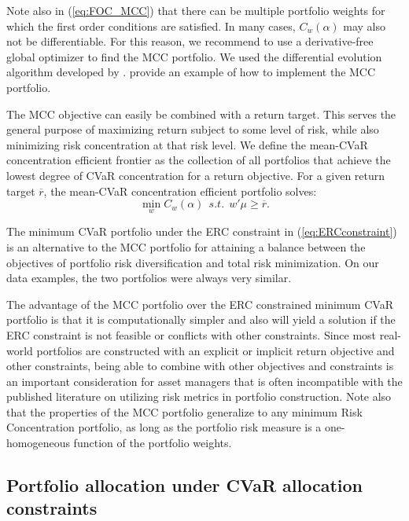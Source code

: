 \documentclass[12pt,a4paper]{article}
\begin{document}
Note also in (\ref{eq:FOC_MCC}) that there can be multiple portfolio weights for which the first order conditions are satisfied. In many cases,  $C_w(\alpha)$ may also not be differentiable. For this reason, we recommend to use a derivative-free global optimizer to find the MCC portfolio. We used the differential evolution algorithm developed by \citet{Price2005}. \citet{Ardia2010} provide an example of how to implement the MCC portfolio.


	The MCC objective can easily be combined with a return target. This serves the general purpose of maximizing return subject to some level of risk, while also minimizing risk concentration at that risk level. We define the mean-CVaR concentration efficient frontier as the collection of all portfolios that achieve the lowest degree of CVaR concentration for a return objective. For a given return target $\overline{r}$,  the mean-CVaR concentration efficient portfolio solves:
\begin{equation} \min_w C_w(\alpha)  \ \ s.t. \ \ w'\mu \geq \overline{r}. \label{eq:CVarConc_frontier}\end{equation}


The minimum CVaR portfolio under the ERC constraint in (\ref{eq:ERCconstraint}) is an alternative to the MCC portfolio for attaining a balance between the objectives of portfolio risk diversification and total risk minimization.  On our data examples, the two portfolios were always very similar.


The advantage of the MCC portfolio over the ERC constrained minimum CVaR portfolio is that it is computationally simpler and also will yield a solution if the ERC constraint is not feasible or conflicts with other constraints. Since most real-world portfolios are constructed with an explicit or implicit return objective and other constraints, being able to combine with other objectives and constraints is an important consideration for asset managers that is often incompatible with the published literature on utilizing risk metrics in portfolio construction. Note also that the properties of the MCC portfolio generalize to any minimum Risk Concentration portfolio, as long as the portfolio risk measure is a one-homogeneous function of the portfolio weights.

\subsection{Portfolio allocation under CVaR allocation constraints}
\end{document}
